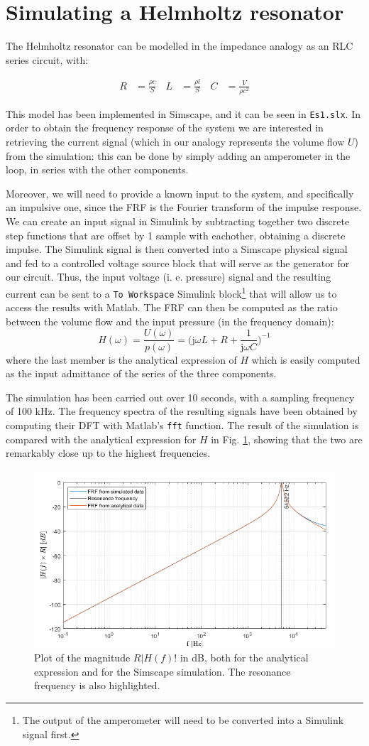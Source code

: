 \documentclass[a4paper]{article}
\begin{document}
\section{Simulating a Helmholtz resonator}

The Helmholtz resonator can be modelled in the impedance analogy as an RLC series circuit, with:

\begin{align*}
	R &= \frac{\rho c}{S}\, &
	L &= \frac{\rho l}{S}\, &
	C &= \frac{V}{\rho c^2}
\end{align*}

This model has been implemented in Simscape, and it can be seen in \texttt{Es1.slx}. In order to obtain the frequency response of the system we are interested in retrieving the current signal (which in our analogy represents the volume flow $U$) from the simulation: this can be done by simply adding an amperometer in the loop, in series with the other components.

Moreover, we will need to provide a known input to the system, and specifically an impulsive one, since the FRF is the Fourier transform of the impulse response. We can create an input signal in Simulink by subtracting together two discrete step functions that are offset by 1 sample with eachother, obtaining a discrete impulse. The Simulink signal is then converted into a Simscape physical signal and fed to a controlled voltage source block that will serve as the generator for our circuit. Thus, the input voltage (i. e. pressure) signal and the resulting current can be sent to a \texttt{To Workspace} Simulink block\footnote{The output of the amperometer will need to be converted into a Simulink signal first.} that will allow us to access the results with Matlab. The FRF can then be computed as the ratio between the volume flow and the input pressure (in the frequency domain):
$$ H(\omega) = \frac{U(\omega)}{p(\omega)} = \biggl( \mathrm{j}\omega L + R + \frac{1}{\mathrm{j}\omega C} \biggr)^{-1}$$
where the last member is the analytical expression of $H$ which is easily computed as the input admittance of the series of the three components.

The simulation has been carried out over 10 seconds, with a sampling frequency of 100 kHz. The frequency spectra of the resulting signals have been obtained by computing their DFT with Matlab's \texttt{fft} function. The result of the simulation is compared with the analytical expression for $H$ in Fig. \ref{fig:es1}, showing that the two are remarkably close up to the highest frequencies.

\begin{figure}[h!]
	\centering
	\includegraphics[width=0.7\linewidth]{es1.png}
	\caption{Plot of the magnitude $R|H(f)!$ in dB, both for the analytical expression and for the Simscape simulation. The resonance frequency is also highlighted.}
	\label{fig:es1}
\end{figure}
\end{document}
